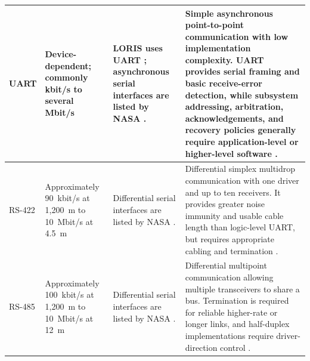 \documentclass[10pt]{../datasheet}
\let\cite\citep
\begin{document}
\begin{longtable}{|
  >{\raggedright\arraybackslash}p{2.5cm}|
  >{\raggedright\arraybackslash}p{2.5cm}|
  >{\raggedright\arraybackslash}p{5.0cm}|
  >{\raggedright\arraybackslash}p{5.2cm}|}
  UART                                                                 &
  Device-dependent; commonly kbit/s to several Mbit/s                  &
  LORIS uses UART \cite{loris_obc_pub}; asynchronous serial interfaces
  are listed by NASA
  \cite[p.~219]{nasa_soa_2022}
  \cite[p.~235]{nasa_soa_2023}
  \cite[p.~240]{nasa_soa_2024}
  \cite[p.~224]{nasa_soa_2026}.                                        &
  Simple asynchronous point-to-point communication with low implementation
  complexity. UART provides serial framing and basic receive-error detection,
  while subsystem addressing, arbitration, acknowledgements, and recovery
  policies generally require application-level or higher-level software
  \cite{microchip_uart}.                                                                     \\ \hline

  RS-422                                                               &
  Approximately 90~kbit/s at 1,200~m to
  10~Mbit/s at 4.5~m                                                   &
  Differential serial interfaces are listed by NASA
  \cite[p.~219]{nasa_soa_2022}
  \cite[p.~235]{nasa_soa_2023}
  \cite[p.~240]{nasa_soa_2024}
  \cite[p.~224]{nasa_soa_2026}.                                        &
  Differential simplex multidrop communication with one driver and up to
  ten receivers. It provides greater noise immunity and usable cable length
  than logic-level UART, but requires appropriate cabling and termination
  \cite{adi_an960}.                                                                          \\ \hline

  RS-485                                                               &
  Approximately 100~kbit/s at 1,200~m to 10~Mbit/s at 12~m             &
  Differential serial interfaces are listed by NASA
  \cite[p.~219]{nasa_soa_2022}
  \cite[p.~235]{nasa_soa_2023}
  \cite[p.~240]{nasa_soa_2024}
  \cite[p.~224]{nasa_soa_2026}.                                        &
  Differential multipoint communication allowing multiple
  transceivers to share a bus. Termination is required for reliable
  higher-rate or longer links, and half-duplex implementations require
  driver-direction control \cite{adi_an960,adi_cn0416}.                                      \\ \hline


\end{longtable}
\end{document}
